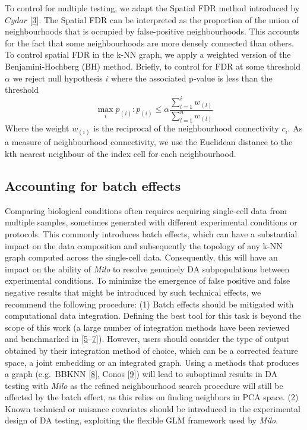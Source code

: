 \documentclass[
]{article}
\begin{document}
To control for multiple testing, we adapt the Spatial FDR method introduced by \(Cydar\) {[}\protect\hyperlink{ref-lunTestingDifferentialAbundance2017}{3}{]}. The Spatial FDR can be interpreted as the proportion of the union of neighbourhoods that is occupied by false-positive neighbourhoods. This accounts for the fact that some neighbourhoods are more densely connected than others. To control spatial FDR in the k-NN graph, we apply a weighted version of the Benjamini-Hochberg (BH) method. Briefly, to control for FDR at some threshold \(\alpha\) we reject null hypothesis \(i\) where the associated p-value is less than the threshold
\[
\max_i{p_{(i)}: p_{(i)}\le \alpha\frac{\sum_{l=1}^{i}w_{(l)}}{\sum_{l=1}^{n}w_{(l)}}}
\]
Where the weight \(w_{(i)}\) is the reciprocal of the neighbourhood connectivity \(c_i\). As a measure of neighbourhood connectivity, we use the Euclidean distance to the kth nearest neighbour of the index cell for each neighbourhood.

\hypertarget{accounting-for-batch-effects}{%
\subsection{Accounting for batch effects}\label{accounting-for-batch-effects}}

Comparing biological conditions often requires acquiring single-cell data from multiple samples, sometimes generated with different experimental conditions or protocols. This commonly introduces batch effects, which can have a substantial impact on the data composition and subsequently the topology of any k-NN graph computed across the single-cell data. Consequently, this will have an impact on the ability of \emph{Milo} to resolve genuinely DA subpopulations between experimental conditions. To minimize the emergence of false positive and false negative results that might be introduced by such technical effects, we recommend the following procedure: (1) Batch effects should be mitigated with computational data integration. Defining the best tool for this task is beyond the scope of this work (a large number of integration methods have been reviewed and benchmarked in {[}\protect\hyperlink{ref-lueckenBenchmarkingAtlaslevelData2020}{5}--\protect\hyperlink{ref-tranBenchmarkBatcheffectCorrection2020}{7}{]}). However, users should consider the type of output obtained by their integration method of choice, which can be a corrected feature space, a joint embedding or an integrated graph. Using a methods that produces a graph (e.g.~BBKNN {[}\protect\hyperlink{ref-polanskiBBKNNFastBatch}{8}{]}, Conos {[}\protect\hyperlink{ref-barkasJointAnalysisHeterogeneous2019}{9}{]}) will lead to suboptimal results in DA testing with \emph{Milo} as the refined neighbourhood search procedure will still be affected by the batch effect, as this relies on finding neighbors in PCA space. (2) Known technical or nuisance covariates should be introduced in the experimental design of DA testing, exploiting the flexible GLM framework used by \emph{Milo}.
\end{document}
